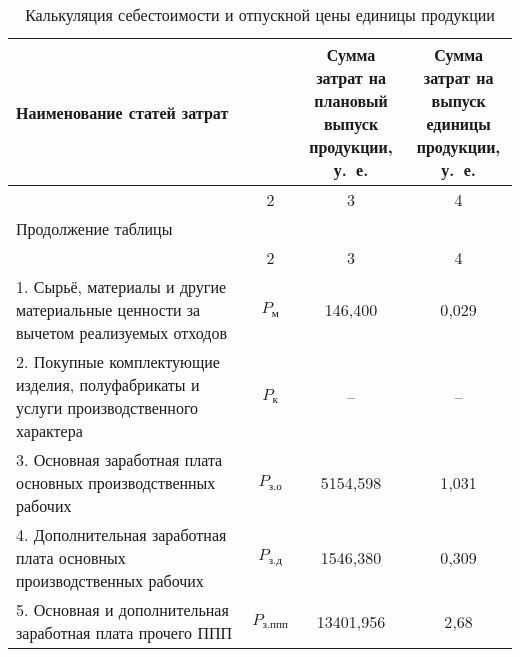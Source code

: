 {\small
\begin{longtable}{| m{10.7cm} | c | c | c |}
  \caption{
    Калькуляция себестоимости и отпускной цены единицы продукции
  }\label{tbl:calculation} \\
      \hline
      \centering Наименование статей затрат
      & \rotatebox[origin=c]{90}{\parbox{3.5cm}{Условное обозначение}}
      & \rotatebox[origin=c]{90}{
        \parbox{3.5cm}{
          Сумма затрат на \\ плановый выпуск \\ продукции, у.~е.
        }
      }
      & \rotatebox[origin=c]{90}{
        \parbox{3.5cm}{
          Сумма затрат на \\ выпуск единицы \\ продукции, у.~е.
        }
      } \\

      \hline
      \centering 1 & 2 & 3 & 4 \\
      \hline
      \endfirsthead 

      \multicolumn{4}{l}{\normalsize Продолжение таблицы \thetable{}} \\
      \hline
      \centering 1 & 2 & 3 & 4 \\
      \hline
      \endhead

      1. Сырьё, материалы и другие материальные ценности \newline
      за вычетом реализуемых отходов
      & \( P_{\text{м}} \) & 146{,}400 & 0{,}029 \\
      \hline

      2. Покупные комплектующие изделия, полуфабрикаты и \newline
      услуги производственного характера
      & \( P_{\text{к}} \) & -- & -- \\
      \hline

      3. Основная заработная плата основных \newline
      производственных рабочих
      & \( P_{\text{з.о}} \) & 5154{,}598 & 1{,}031 \\
      \hline

      4. Дополнительная заработная плата основных \newline
      производственных рабочих
      & \( P_{\text{з.д}} \) & 1546{,}380 & 0{,}309 \\
      \hline

      5. Основная и дополнительная заработная плата \newline
      прочего ППП
      & \( P_{\text{з.ппп}} \) & 13401{,}956 & 2{,}68 \\
      \hline


\end{longtable}}

